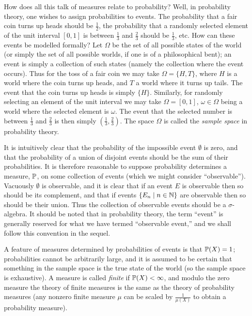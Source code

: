 \documentclass{article}
\theoremstyle{definition}
\newcommand{\bldset}[2]{\{{#1}\mid{#2}\}}
\begin{document}
How does all this talk of measures relate to probability? Well, in probability theory, one wishes to assign probabilities to events. The probability that a fair coin turns up heads should be $\frac{1}{2}$, the probability that a randomly selected element of the unit interval $[0,1]$ is between $\frac{1}{3}$ and $\frac{2}{3}$ should be $\frac{1}{3}$, etc. How can these events be modelled formally? Let $\Omega$ be the set of all possible states of the world (or simply the set of all possible worlds, if one is of a philosophical bent); an event is simply a collection of such states (namely the collection where the event occurs). Thus for the toss of a fair coin we may take $\Omega = \{H, T\}$, where $H$ is a world where the coin turns up heads, and $T$ a world where it turns up tails. The event that the coin turns up heads is simply $\{H\}$. Similarly, for randomly selecting an element of the unit interval we may take $\Omega = [0,1]$, $\omega \in \Omega$ being a world where the selected element is $\omega$. The event that the selected number is between $\frac{1}{3}$ and $\frac{2}{3}$ is then simply $(\frac{1}{3}, \frac{2}{3})$. The space $\Omega$ is called the {\em sample space} in probability theory.

It is intuitively clear that the probability of the impossible event $\emptyset$ is zero, and that the probability of a union of disjoint events should be the sum of their probabilities. It is therefore reasonable to suppose probability determines a measure, $\P$, on some collection of events (which we might consider ``observable''). Vacuously $\emptyset$ is observable, and it is clear that if an event $E$ is observable then so should be its complement, and that if events $\bldset{E_n}{n \in \N}$ are observable then so should be their union. Thus the collection of observable events should be a $\sigma$-algebra. It should be noted that in probability theory, the term ``event'' is generally reserved for what we have termed ``observable event,'' and we shall follow this convention in the sequel.

A feature of measures determined by probabilities of events is that $\P(X) = 1$; probabilities cannot be arbitrarily large, and it is assumed to be certain that something in the sample space is the true state of the world (so the sample space is exhaustive). A measure is called {\em finite} if $\P(X) < \infty$, and modulo the zero measure the theory of finite measures is the same as the theory of probability measures (any nonzero finite measure $\mu$ can be scaled by $\frac{1}{\mu(X)}$ to obtain a probability measure).
\end{document}
